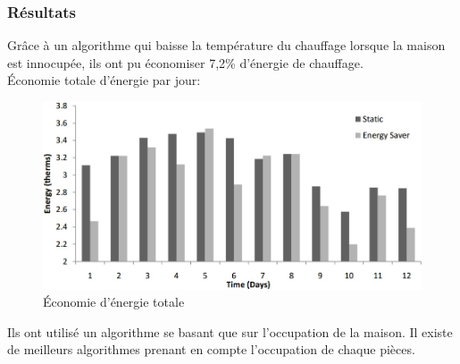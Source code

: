 \begin{frame}
 \frametitle{Résultats}
 Grâce à un algorithme qui baisse la température du chauffage lorsque la maison est innocupée, ils ont pu économiser 7,2\% d'énergie de chauffage.\\
 Économie totale d'énergie par jour:
 \begin{figure}
  \centering
  \includegraphics[scale=0.38]{figures/energysaver.jpg}
  \caption{Économie d'énergie totale}
 \end{figure} 
 Ils ont utilisé un algorithme se basant que sur l'occupation de la maison. Il existe de meilleurs algorithmes prenant en compte l'occupation de chaque pièces.
\end{frame}

 
 